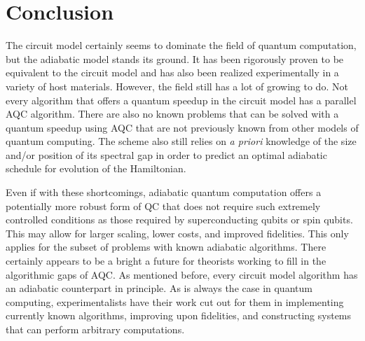 \documentclass[%
 reprint,
 amsmath,amssymb,
 aps,
]{revtex4-1}
\begin{document}
	\section{Conclusion}
		
	The circuit model certainly seems to dominate the field of quantum computation, but the adiabatic model stands its ground. It has been rigorously proven to be equivalent to the circuit model and has also been realized experimentally in a variety of host materials. However, the field still has a lot of growing to do. Not every algorithm that offers a quantum speedup in the circuit model has a parallel AQC algorithm. There are also no known problems that can be solved with a quantum speedup using AQC that are not previously known from other models of quantum computing. The scheme also still relies on \textit{a priori} knowledge of the size and/or position of its spectral gap in order to predict an optimal adiabatic schedule for evolution of the Hamiltonian.	

	Even if with these shortcomings, adiabatic quantum computation offers a potentially more robust form of QC that does not require such extremely controlled conditions as those required by superconducting qubits or spin qubits. This may allow for larger scaling, lower costs, and improved fidelities. This only applies for the subset of problems with known adiabatic algorithms. There certainly appears to be a bright a future for theorists working to fill in the algorithmic gaps of AQC. As mentioned before, every circuit model algorithm has an adiabatic counterpart in principle. As is always the case in quantum computing, experimentalists have their work cut out for them in implementing currently known algorithms, improving upon fidelities, and constructing systems that can perform arbitrary computations.


\nocite{*} %
\end{document}
